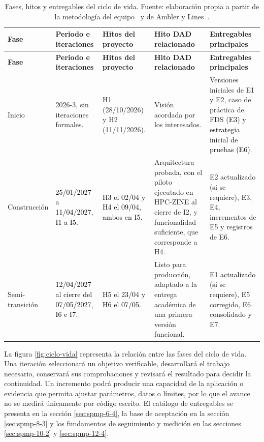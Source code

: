 \begin{longtable}{|p{}|p{}|p{}|p{}|p{}|}
\caption{Fases, hitos y entregables del ciclo de vida. Fuente: elaboración propia a partir de la metodología del equipo~\cite{adaptacion2026} y de Ambler y Lines~\cite{ambler2012dad}.}\label{tab:fases-hitos}\\
\hline
\textbf{Fase} & \textbf{Periodo e iteraciones} & \textbf{Hitos del proyecto} & \textbf{Hito DAD relacionado} & \textbf{Entregables principales}\\\hline
\endfirsthead
\hline
\textbf{Fase} & \textbf{Periodo e iteraciones} & \textbf{Hitos del proyecto} & \textbf{Hito DAD relacionado} & \textbf{Entregables principales}\\\hline
\endhead
Inicio & 2026-3, sin iteraciones formales. & H1 (28/10/2026) y H2 (11/11/2026). & Visión acordada por los interesados. & Versiones iniciales de E1 y E2, caso de práctica de FDS \textcolor{black}{(E3) y estrategia inicial de pruebas (E6)}.\\\hline
Construcción & \textcolor{black}{25/01/2027 a 11/04/2027, I1 a I5.} & \textcolor{black}{H3 el 02/04 y H4 el 09/04, ambos en I5.} & Arquitectura probada, con el piloto ejecutado en HPC-ZINE al cierre de I2, y funcionalidad suficiente, que corresponde a H4. & E2 actualizado \textcolor{black}{(si se requiere)}, E3, E4, incrementos de E5 y registros de E6.\\\hline
Semi-\allowbreak{}transición & \textcolor{black}{12/04/2027 al cierre del 07/05/2027, I6 e I7.} & \textcolor{black}{H5 el 23/04 y H6 el 07/05.} & Listo para producción, adaptado a la entrega académica de una primera versión funcional. & \textcolor{black}{E1 actualizado (si se requiere),} E5 corregido, E6 consolidado y E7.\\\hline
\end{longtable}

La figura \ref{fig:ciclo-vida} representa la relación entre las fases del ciclo de vida. Una iteración seleccionará un objetivo verificable, desarrollará el trabajo necesario, conservará sus comprobaciones y revisará el resultado para decidir la continuidad. Un incremento podrá producir una capacidad de la aplicación o evidencia que permita ajustar parámetros, datos o límites, por lo que el avance no se medirá únicamente por código escrito. El catálogo de entregables se presenta en la sección \ref{sec:spmp-6-4}, la base de aceptación en la sección \ref{sec:spmp-8-3} y los fundamentos de seguimiento y medición en las secciones \ref{sec:spmp-10-2} y \ref{sec:spmp-12-4}.


